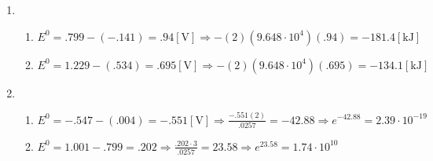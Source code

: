 \documentclass[12pt]{article}
\begin{document}
\begin{enumerate}
\begin{enumerate}
    \end{enumerate}

  \item

    \begin{enumerate}

      \item $E^0=.799-(-.141)=.94[\si{\volt}]\Rightarrow -(2)\left( 9.648\cdot10^{4} \right)(.94)=-181.4[\si{\kilo\joule}]$

      \item $E^0=1.229-(.534)=.695[\si{\volt}]\Rightarrow -(2)\left( 9.648\cdot10^{4} \right)\left( .695 \right)=-134.1[\si{\kilo\joule}]$

    \end{enumerate}

  \item 

    \begin{enumerate}

      \item $E^0=-.547-(.004)=-.551[\si{\volt}]\Rightarrow \frac{-.551(2)}{.0257}=-42.88\Rightarrow e^{-42.88}=2.39\cdot10^{-19}$

      \item $E^0=1.001-.799=.202\Rightarrow\frac{.202\cdot3}{.0257}=23.58\Rightarrow e^{23.58}=1.74\cdot10^{10}$

    \end{enumerate}

\end{enumerate}
\end{document}
